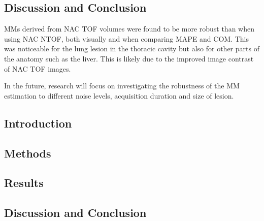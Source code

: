         \subsection{Discussion and Conclusion} \label{impact_of_tof_on_respiratory_motion_modelling_using_nac_pet_discussion_and_conclusion}
            \gls{MM}s derived from \gls{NAC} \gls{TOF} volumes were found to be more robust than when using \gls{NAC} \gls{NTOF}, both visually and when comparing \gls{MAPE} and \gls{COM}. This was noticeable for the lung lesion in the thoracic cavity but also for other parts of the anatomy such as the liver. This is likely due to the improved image contrast of \gls{NAC} \gls{TOF} images.

            In the future, research will focus on investigating the robustness of the \gls{MM} estimation to different noise levels, acquisition duration and size of lesion.
    
        \blindtext
        
        \subsection{Introduction} \label{impact_of_tof_on_respiratory_motion_modelling_using_nac_pet_an_extension_to_inter_and_intra_respiratory_cycle_variation_introduction}
        
        \subsection{Methods} \label{impact_of_tof_on_respiratory_motion_modelling_using_nac_pet_an_extension_to_inter_and_intra_respiratory_cycle_variation_methods}
            \blindtext
            
        \subsection{Results} \label{impact_of_tof_on_respiratory_motion_modelling_using_nac_pet_an_extension_to_inter_and_intra_respiratory_cycle_variation_results}
            \blindtext
            
        \subsection{Discussion and Conclusion} \label{impact_of_tof_on_respiratory_motion_modelling_using_nac_pet_an_extension_to_inter_and_intra_respiratory_cycle_variation_discussion_and_conclusion}
            \blindtext
    
